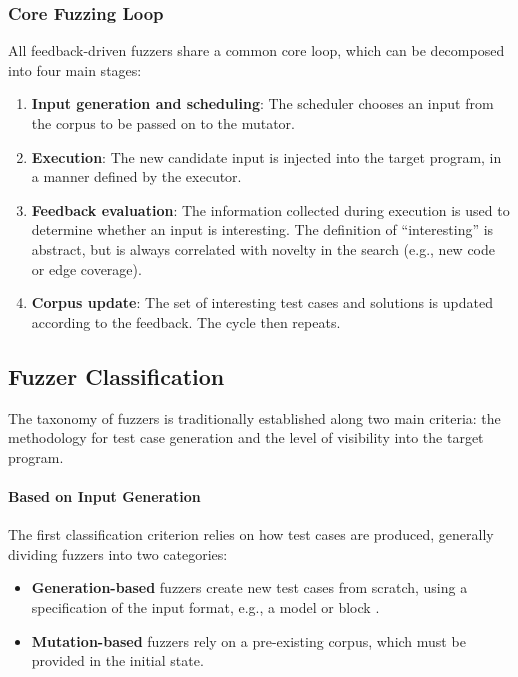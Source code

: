 \subsubsection{Core Fuzzing Loop}

All feedback-driven fuzzers share a common core loop, which can be decomposed into four main stages:
\begin{enumerate}
    \item \textbf{Input generation and scheduling}: The scheduler chooses an input from the corpus to be passed on to the mutator.

    \item \textbf{Execution}: The new candidate input is injected into the target program, in a manner defined by the executor.

    \item \textbf{Feedback evaluation}: The information collected during execution is used to determine whether an input is interesting. The definition of ``interesting'' is abstract, but is always correlated with novelty in the search (e.g., new code or edge coverage).

    \item \textbf{Corpus update}: The set of interesting test cases and solutions is updated according to the feedback. The cycle then repeats.
\end{enumerate}

\subsection{Fuzzer Classification}

The taxonomy of fuzzers is traditionally established along two main criteria: the methodology for test case generation and the level of visibility into the target program.

\paragraph{Based on Input Generation} The first classification criterion relies on how test cases are produced, generally dividing fuzzers into two categories:
\begin{itemize}
    \item \textbf{Generation-based} fuzzers create new test cases from scratch, using a specification of the input format, e.g., a model \cite{peachfuzzer} or block \cite{aitel2002advantages}.

    \item \textbf{Mutation-based} fuzzers rely on a pre-existing corpus, which must be provided in the initial state.
\end{itemize}

